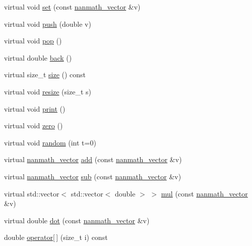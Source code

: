 \begin{DoxyCompactItemize}
\item 
virtual void \hyperlink{classnanmath_1_1nanmath__vector_a3817b1a44c8c29befa7c72918f227e5f}{set} (const \hyperlink{classnanmath_1_1nanmath__vector}{nanmath\+\_\+vector} \&v)
\item 
virtual void \hyperlink{classnanmath_1_1nanmath__vector_af8019f9e3eb27a88c77cd302bd4e0f49}{push} (double v)
\item 
virtual void \hyperlink{classnanmath_1_1nanmath__vector_ad93f89bf79b97ada43b1b5eb6a20f3b8}{pop} ()
\item 
virtual double \hyperlink{classnanmath_1_1nanmath__vector_aee746173d201103146b602dbb48582c4}{back} ()
\item 
virtual size\+\_\+t \hyperlink{classnanmath_1_1nanmath__vector_a3cf8be42dcdac880c4107bd19ba2d034}{size} () const 
\item 
virtual void \hyperlink{classnanmath_1_1nanmath__vector_ab83eb8611ce5cc0056f3d66455a2c268}{resize} (size\+\_\+t s)
\item 
virtual void \hyperlink{classnanmath_1_1nanmath__vector_a2040460e12d62f93075a0ac5dcb47b67}{print} ()
\item 
virtual void \hyperlink{classnanmath_1_1nanmath__vector_a61b03b8b22481dc0fb233aca6062498a}{zero} ()
\item 
virtual void \hyperlink{classnanmath_1_1nanmath__vector_a4a174f6e1c4b2e9b5ab605c2cbbfca85}{random} (int t=0)
\item 
virtual \hyperlink{classnanmath_1_1nanmath__vector}{nanmath\+\_\+vector} \hyperlink{classnanmath_1_1nanmath__vector_a1fe657deb1a6f3b098cd3c1b386f592e}{add} (const \hyperlink{classnanmath_1_1nanmath__vector}{nanmath\+\_\+vector} \&v)
\item 
virtual \hyperlink{classnanmath_1_1nanmath__vector}{nanmath\+\_\+vector} \hyperlink{classnanmath_1_1nanmath__vector_a2d41772f5b4341d49b33e05aa37133bc}{sub} (const \hyperlink{classnanmath_1_1nanmath__vector}{nanmath\+\_\+vector} \&v)
\item 
virtual std\+::vector$<$ std\+::vector$<$ double $>$ $>$ \hyperlink{classnanmath_1_1nanmath__vector_ad39a2000dbf1c548f38d142295083020}{mul} (const \hyperlink{classnanmath_1_1nanmath__vector}{nanmath\+\_\+vector} \&v)
\item 
virtual double \hyperlink{classnanmath_1_1nanmath__vector_a146b0021c851cd9bf84ddc66dad014e7}{dot} (const \hyperlink{classnanmath_1_1nanmath__vector}{nanmath\+\_\+vector} \&v)
\item 
double \hyperlink{classnanmath_1_1nanmath__vector_aa1a70b8264872ac95c4ce36005ffe23b}{operator\mbox{[}$\,$\mbox{]}} (size\+\_\+t i) const 
\end{DoxyCompactItemize}
